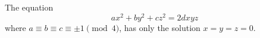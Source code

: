 \begin{proposition}\label{eq:098}
    The equation
\[
    ax^2+by^2+cz^2=2dxyz
\]
    where $a\equiv b\equiv c\equiv\pm1\pmod4$, has only the solution $x=y=z=0$.
\end{proposition}
